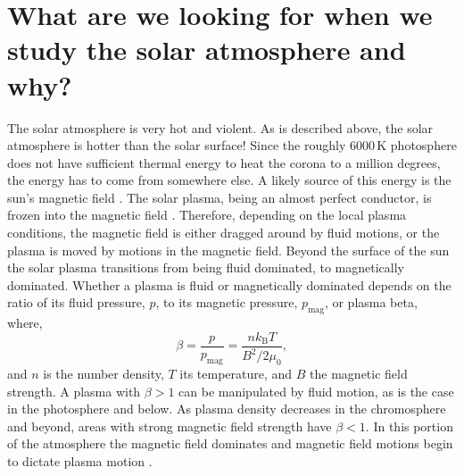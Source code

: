  
\section{What are we looking for when we study the solar atmosphere and why?}
The solar atmosphere is very hot and violent.
As is described above, the solar atmosphere is hotter than the solar surface!
Since the roughly 6000\,K photosphere does not have sufficient thermal energy to heat the corona to a million degrees, the energy has to come from somewhere else. 
A likely source of this energy is the sun's magnetic field \citep{Priest2014}.
The solar plasma, being an almost perfect conductor, is frozen into the magnetic field \citep{Priest2014}.
Therefore, depending on the local plasma conditions, the magnetic field is either dragged around by fluid motions, or the plasma is moved by motions in the magnetic field.
Beyond the surface of the sun the solar plasma transitions from being fluid dominated, to magnetically dominated.
Whether a plasma is fluid or magnetically dominated depends on the ratio of its fluid pressure, $p$, to its magnetic pressure, $p_\text{mag}$, or plasma beta, where,
\begin{equation}
	\beta = \frac{p}{p_\text{mag}} = \frac{nk_\text{B}T}{B^2 / 2\mu_0},
\end{equation}
and $n$ is the number density, $T$ its temperature, and $B$ the magnetic field strength.
A plasma with $\beta>1$ can be manipulated by fluid motion, as is the case in the photosphere and below.
As plasma density decreases in the chromosphere and beyond, areas with strong magnetic field strength have $\beta<1$.  
In this portion of the atmosphere the magnetic field dominates and magnetic field motions begin to dictate plasma motion \citep{Priest2014}.

